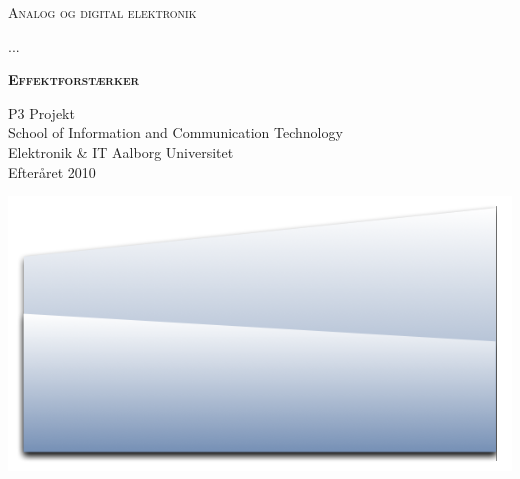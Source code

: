 \begin{center}
\textsc{\huge Analog og digital elektronik\\}
\vspace{5 mm}

\textsc{\Large ...\\}
\vspace{25 mm}

\textsc{\textbf{\HUGE Effektforstærker\\}}
\vspace{20 mm}

\begin{flushright}
P3 Projekt \\
School of Information and Communication Technology \\
Elektronik \& IT Aalborg Universitet \\
Efteråret 2010 \\
\end{flushright}

\includegraphics[width=1.0\textwidth]{forside/forside.png}

\end{center}